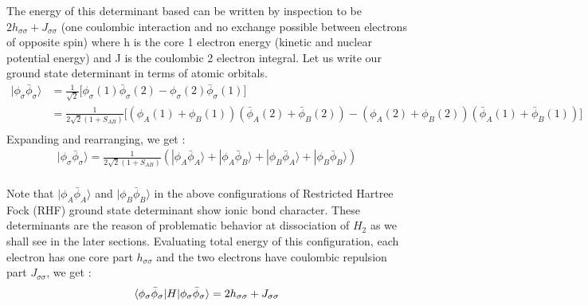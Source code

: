 \documentclass[11pt]{article}   	%
\begin{document}
	The energy of this determinant based can be written by inspection to be $2h_{\sigma \sigma} + J_{\sigma \sigma}$ (one coulombic interaction 
	and no exchange possible between electrons of opposite spin) where h is the core 1 electron energy (kinetic and nuclear potential energy)
	and J is the coulombic 2 electron integral. Let us write our ground state determinant in terms of atomic orbitals.\\
	\begin{equation}
	\begin{split}
		|\phi_{\sigma}\bar{\phi}_{\sigma}\rangle &=\frac{1}{\sqrt{2}}\big[ \phi_{\sigma}(1)\bar{\phi}_{\sigma}(2)
				-\phi_{\sigma}(2)\bar{\phi}_{\sigma}(1)\big]\\
			&=\frac{1}{2\sqrt{2}(1+S_{AB})}\big[(\phi_A(1)+\phi_B(1))(\bar{\phi}_A(2)+\bar{\phi}
			_B(2))-(\phi_A(2)+\phi_B(2))(\bar{\phi}_A(1)+\bar{\phi}_B(1))\big]\\
	\end{split}
	\end{equation}
	Expanding and rearranging, we get :\\
	\begin{equation}
	\begin{split}
	|\phi_{\sigma}\bar{\phi}_{\sigma}\rangle=\frac{1}{2\sqrt{2}(1+S_{AB})}(|\phi_A \bar{\phi}_A\rangle+|\phi_A \bar{\phi}_B\rangle+|\phi_B \bar{\phi}_A\rangle+|\phi_B \bar{\phi}_B\rangle)\\
	\end{split}
	\end{equation}
	
	Note that $|\phi_A \bar{\phi}_A\rangle$ and $|\phi_B \bar{\phi}_B\rangle$ in the above configurations of Restricted Hartree Fock (RHF) ground 
	state determinant show ionic bond character. 
	These determinants are the reason of problematic behavior at dissociation of $H_2$ as we shall see in the later sections. 
	Evaluating total energy of this configuration, each electron has one core part $h_{\sigma \sigma}$ and 
	the two electrons have coulombic repulsion part $J_{\sigma \sigma}$, we get :\\
	\begin{equation}
		\langle\phi_{\sigma}\bar{\phi}_{\sigma}|H|\phi_{\sigma}\bar{\phi}_{\sigma}\rangle
		=2 h_{\sigma \sigma}+J_{\sigma \sigma}\\
	\end{equation}
	
\end{document}
